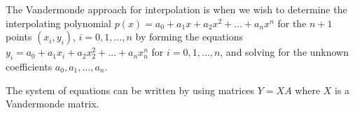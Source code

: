 \documentclass[12pt]{article}
\begin{document}
The Vandermonde approach for interpolation is when we wish to determine the interpolating polynomial $p(x)=a_0 + a_1x + a_2x^2 + \ldots +a_nx^n$ for the $n+1$ points $(x_i,y_i)$, $i=0,1,\ldots, n$ by forming the equations $y_i=a_0+a_1x_i+a_2x_2^2+\ldots+a_nx_n^n$ for $i = 0,1,\ldots,n$, and solving for the unknown coefficients $a_0, a_1,\ldots, a_n$. 

The system of equations can be written by using matrices $Y=XA$ where $X$ is a Vandermonde matrix.
\end{document}
